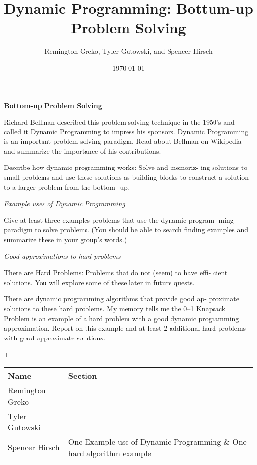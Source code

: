 \documentclass{article}
\begin{document}
\title{\textbf{Dynamic Programming: Bottum-up Problem Solving}}
\author{Remington Greko, Tyler Gutowski, and Spencer Hirsch}
\date{\today}

\maketitle

\noindent \textbf{Bottom-up Problem Solving} 


Richard Bellman described this problem solving technique in the
1950’s and called it Dynamic Programming to impress his sponsors.
Dynamic Programming is an important problem solving paradigm.
Read about Bellman on Wikipedia and summarize the importance
of his contributions.

\medskip

Describe how dynamic programming works: Solve and memoriz-
ing solutions to small problems and use these solutions as building
blocks to construct a solution to a larger problem from the bottom-
up.

\bigskip

\noindent \textit{Example uses of Dynamic Programming}


Give at least three examples problems that use the dynamic program-
ming paradigm to solve problems. (You should be able to search
finding examples and summarize these in your group’s words.)

\bigskip

\noindent \textit{Good approximations to hard problems}

\medskip

There are Hard Problems: Problems that do not (seem) to have effi-
cient solutions. You will explore some of these later in future quests.

\medskip

There are dynamic programming algorithms that provide good ap-
proximate solutions to these hard problems. My memory tells me the
0–1 Knapsack Problem is an example of a hard problem with a good
dynamic programming approximation. Report on this example and
at least 2 additional hard problems with good approximate solutions.


\pagebreak+

\begin{center}
        \begin{tabular}{|p{3cm}|p{6cm}|}
            \hline
            \textbf{Name} & \textbf{Section} \\
            \hline
            Remington Greko &  \\
            \hline
            Tyler Gutowski &  \\
            \hline
            Spencer Hirsch & One Example use of Dynamic Programming $\&$ One hard algorithm example\\
            \hline
        \end{tabular}
    \end{center}
    
\end{document}

